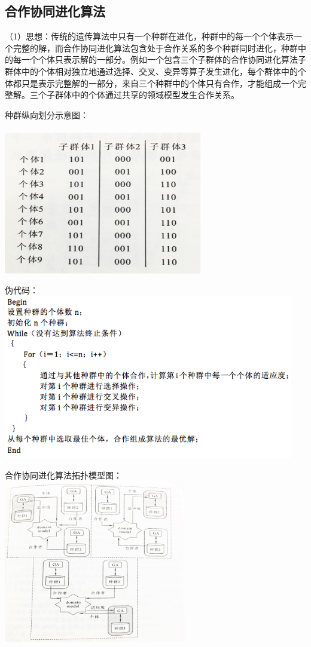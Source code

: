 \documentclass[8pt]{article}
\begin{document}
\subsection{合作协同进化算法}
\begin{description}
      \item（1）思想：传统的遗传算法中只有一个种群在进化，种群中的每一个个体表示一个完整的解，而合作协同进化算法包含处于合作关系的多个种群同时进化，种群中的每一个个体只表示解的一部分。例如一个包含三个子群体的合作协同进化算法子群体中的个体相对独立地通过选择、交叉、变异等算子发生进化，每个群体中的个体都只是表示完整解的一部分，来自三个种群中的个体只有合作，才能组成一个完整解。三个子群体中的个体通过共享的领域模型发生合作关系。
      \item 种群纵向划分示意图：\\\\
       \includegraphics[width=0.65\textwidth]{12.png}
      \item 伪代码：\\
      \includegraphics[width=0.95\textwidth]{13.png}
      \item 合作协同进化算法拓扑模型图：\\
      \includegraphics[width=0.6\textwidth]{14.png}

\end{description}
\end{document}
